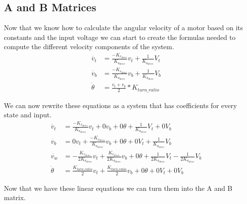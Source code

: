 \documentclass{scrartcl}
\begin{document}
\subsection{A and B Matrices}
Now that we know how to calculate the angular velocity of a motor based on its constants and the input voltage we can start to create the formulas needed to compute the different velocity components of the system.
\begin{align}
    \dot{v_t}    & = \frac{-K_{v_\mathit{drive}}}{K_{a_\mathit{drive}}}v_t + \frac{1}{K_{a_\mathit{drive}}}V_t \\
    \dot{v_b}    & = \frac{-K_{v_\mathit{drive}}}{K_{a_\mathit{drive}}}v_b + \frac{1}{K_{a_\mathit{drive}}}V_b \\
    \dot{\theta} & = \frac{v_t + v_b}{2} * K_\mathit{turn\_ratio}
\end{align}

We can now rewrite these equations as a system that has coefficients for every state and input.
\begin{align}
    \dot{v_t}    & = \frac{-K_{v_\mathit{drive}}}{K_{a_\mathit{drive}}}v_t + 0v_b + 0\theta + \frac{1}{K_{a_\mathit{drive}}}V_t + 0V_b                                                                                  \\
    \dot{v_b}    & = 0v_t + \frac{-K_{v_\mathit{drive}}}{K_{a_\mathit{drive}}}v_b + 0\theta + 0V_t + \frac{1}{K_{a_\mathit{drive}}}V_b                                                                                  \\
    \dot{v_w}    & = -\frac{K_{v_\mathit{drive}}}{2K_{a_\mathit{drive}}}v_t + \frac{K_{v_\mathit{drive}}}{2K_{a_\mathit{drive}}}v_b + 0\theta + \frac{1}{2K_{a_\mathit{drive}}}V_t - \frac{1}{2K_{a_\mathit{drive}}}V_b \\
    \dot{\theta} & = \frac{K_\mathit{turn\_ratio}}{2}v_t + \frac{K_\mathit{turn\_ratio}}{2}v_b + 0\theta + 0V_t + 0V_b
\end{align}

Now that we have these linear equations we can turn them into the A and B matrix.
\end{document}
